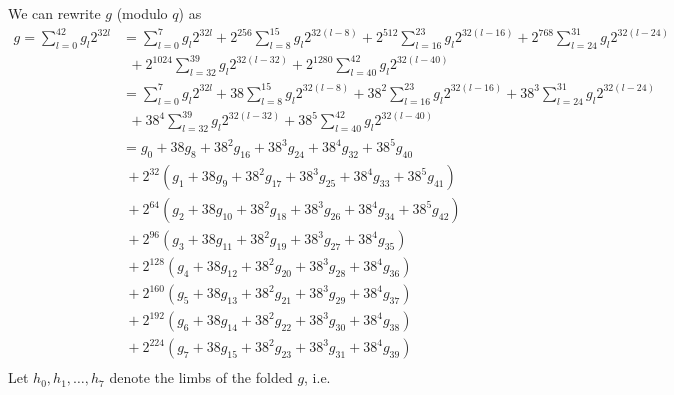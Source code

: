 \documentclass[a4paper, 12pt]{article}
\begin{document}
We can rewrite $g$ (modulo $q$) as
\begin{align*}
  g  = \sum^{42}_{l=0} g_l 2^{32l} &=  \sum^{7}_{l=0} g_l 2^{32l} + 2^{256} \sum^{15}_{l=8} g_l 2^{32(l-8)} + 2^{512} \sum^{23}_{l=16} g_l 2^{32(l-16)}+ 2^{768} \sum^{31}_{l=24} g_l 2^{32(l-24)}\\
                                   &\ \  + 2^{1024} \sum^{39}_{l=32} g_l 2^{32(l-32)}+ 2^{1280} \sum^{42}_{l=40} g_l 2^{32(l-40)} \\
                                   &=  \sum^{7}_{l=0} g_l 2^{32l} + 38 \sum^{15}_{l=8} g_l 2^{32(l-8)} + 38^2 \sum^{23}_{l=16} g_l 2^{32(l-16)}+ 38^3 \sum^{31}_{l=24} g_l 2^{32(l-24)}\\
                                   &\ \  + 38^4 \sum^{39}_{l=32} g_l 2^{32(l-32)}+ 38^5 \sum^{42}_{l=40} g_l 2^{32(l-40)} \\
                                   & = g_0 + 38 g_8 + 38^2 g_{16} + 38^3 g_{24} + 38^4 g_{32} + 38^5 g_{40}\\
                                   & \ + 2^{32} \left( g_1 + 38 g_9 + 38^2 g_{17} + 38^3 g_{25} + 38^4 g_{33} + 38^5 g_{41} \right)\\
                                   & \ + 2^{64} \left( g_2 + 38 g_{10} + 38^2 g_{18} + 38^3 g_{26} + 38^4 g_{34} + 38^5 g_{42} \right)\\
                                   & \ + 2^{96} \left( g_3 + 38 g_{11} + 38^2 g_{19} + 38^3 g_{27} + 38^4 g_{35} \right)\\
                                   & \ + 2^{128} \left( g_4 + 38 g_{12} + 38^2 g_{20} + 38^3 g_{28} + 38^4 g_{36} \right)\\
                                   & \ + 2^{160} \left( g_5 + 38 g_{13} + 38^2 g_{21} + 38^3 g_{29} + 38^4 g_{37} \right)\\
                                   & \ + 2^{192} \left( g_6 + 38 g_{14} + 38^2 g_{22} + 38^3 g_{30} + 38^4 g_{38} \right)\\
                                   & \ + 2^{224} \left( g_7 + 38 g_{15} + 38^2 g_{23} + 38^3 g_{31} + 38^4 g_{39} \right)\\
\end{align*}
Let $h_0, h_1,\ldots,h_7$ denote the limbs of the folded $g$, i.e.
\end{document}
